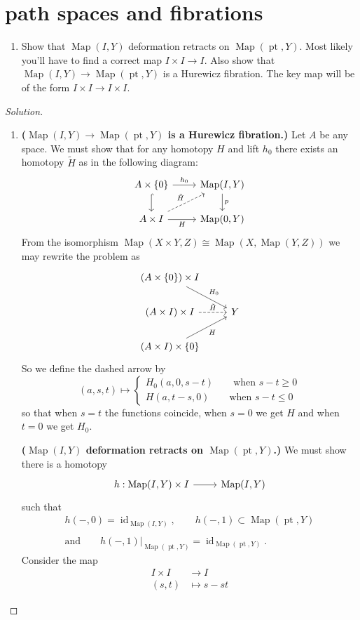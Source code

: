 \documentclass{article}
\numberwithin{equation}{section}
\DeclareMathOperator{\id}{id}
\DeclareMathOperator{\pt}{pt}
\DeclareMathOperator{\Map}{Map}
\begin{document}
\section{path spaces and fibrations}
\begin{exercise}\leavevmode
	\begin{enumerate}[label*=\alph*.]
		\item Show that $\Map(I,Y)$ deformation retracts on $\Map(\pt,Y)$. Most likely you’ll have to find a correct map $I\times I\to I$. Also show that $\Map(I,Y)\to \Map(\pt,Y)$ is a Hurewicz fibration. The key map will be of the form $I \times I \to I \times I$.
	\end{enumerate}
\end{exercise}
\begin{proof}[Solution]\leavevmode
	\begin{enumerate}[label*=\alph*.]
		\item
		
		\textbf{($\Map(I,Y)\to\Map(\pt,Y)$ is a Hurewicz fibration.)} Let $A$ be any space. We must show that for any homotopy $H$ and lift $h_0$ there exists an homotopy $\tilde{H}$ as in the following diagram:
		\[\begin{tikzcd}
			A\times\{0\}\arrow[d,hook]\arrow[r,"h_0"]&\Map(I,Y)\arrow[d,"p"]\\
			A\times I\arrow[ur,dashed,"\tilde{H}"]\arrow[r,"H",swap]&\Map(0,Y)
		\end{tikzcd}\]
		From the isomorphism $\Map(X\times Y,Z)\cong\Map(X,\Map(Y,Z))$ we may rewrite the problem as
		\[\begin{tikzcd}
			(A\times\{0\})\times I\arrow[dr,"H_0"]\\
			(A\times I)\times I\arrow[r,dashed,"\tilde{H}"]&Y\\
			(A\times I)\times \{0\}\arrow[ur,"H",swap]
		\end{tikzcd}\]
		So we define the dashed arrow by
		\[(a,s,t)\mapsto\begin{cases}
			H_0(a,0,s-t)\qquad \text{when }s-t\geq0\\
			H(a,t-s,0)\qquad\text{when }s-t\leq0
		\end{cases}\]
		so that when $s=t$ the functions coincide, when $s=0$ we get $H$ and when $t=0$ we get $H_0$.
		
		\vspace{1cm}
		\textbf{($\Map(I,Y)$ deformation retracts on $\Map(\pt,Y)$.)} We must show there is a homotopy
		\[\begin{tikzcd}
			h:\Map(I,Y)\times I\arrow[r]&\Map(I,Y)
		\end{tikzcd}\]
		such that
		\begin{gather*}
			h(-,0)=\id_{\Map(I,Y)},\qquad h(-,1)\subset\Map(\pt,Y)\\\\ \text{and}\qquad h(-,1)|_{\Map(\pt,Y)}=\id_{\Map(\pt,Y)}.
		\end{gather*}
		Consider the map
		\begin{align*}
			I\times I&\to I\\
			(s,t)&\mapsto s-st
		\end{align*}
		

\end{enumerate}
\end{proof}
\end{document}

